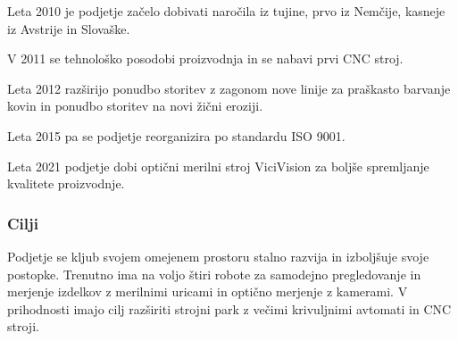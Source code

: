 Leta 2010 je podjetje začelo dobivati naročila iz tujine,
prvo iz Nemčije, kasneje iz Avstrije in Slovaške.

V 2011 se tehnološko posodobi proizvodnja
in se nabavi prvi CNC stroj.

Leta 2012 razširijo ponudbo storitev z zagonom nove linije za praškasto barvanje
kovin in ponudbo storitev na novi žični eroziji.

Leta 2015 pa se podjetje reorganizira po standardu ISO 9001.

Leta 2021 podjetje dobi optični merilni stroj ViciVision za boljše spremljanje
kvalitete proizvodnje.

\subsubsection{Cilji}
Podjetje se kljub svojem omejenem prostoru stalno razvija in izboljšuje
svoje postopke. Trenutno ima na voljo štiri robote za samodejno pregledovanje
in merjenje izdelkov z merilnimi uricami in optično merjenje z kamerami.
V prihodnosti imajo cilj razširiti strojni park z večimi krivuljnimi avtomati
in CNC stroji.
